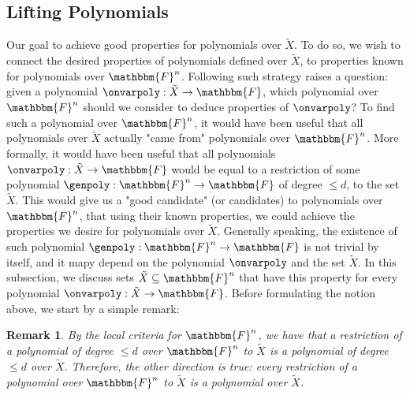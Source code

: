 \documentclass[10pt,a4paper]{article}
\newtheorem{example}[theorem]{Example}
\newtheorem{remark}[theorem]{Remark}
\newcommand{\definedas}[0]{\coloneqq}
\newcommand{\parens}[1]{\left( #1 \right)}
\newcommand{\set}[1]{\left\{ #1 \right\}}
\newcommand{\suchthat}[0]{\middle|}
\newcommand{\basefield}[0]{\mathbbm{F}}
\newcommand{\blocklength}[0]{n}
\newcommand{\field}[0]{\basefield^{\blocklength}}
\newcommand{\degree}[0]{d}
\newcommand{\funcdef}[3]{#1:#2\rightarrow#3}
\newcommand{\variety}{{\tilde{X}}}
\newcommand{\zerofunc}[1]{Z \parens{#1}}
\begin{document}
\subsection[Lifting Polynomials]{Lifting Polynomials}\label{subsec:lifting-polynomials}
Our goal to achieve good properties for polynomials over $\variety$.
To do so, we wish to connect the desired properties of polynomials defined over $\variety$, to properties known for polynomials over $\field$.
Following such strategy raises a question: given a polynomial $\funcdef{\onvarpoly}{\variety}{\basefield}$, which polynomial over $\field$ should we consider to deduce properties of $\onvarpoly$?
To find such a polynomial over $\field$, it would have been useful that all polynomials over $\variety$ actually "came from" polynomials over $\field$.
More formally, it would have been useful that all polynomials $\funcdef{\onvarpoly}{\variety}{\basefield}$ would be equal to a restriction of some polynomial $\funcdef{\genpoly}{\field}{\basefield}$ of degree $\leq \degree$, to the set $\variety$.
This would give us a "good candidate" (or candidates) to polynomials over $\field$, that using their known properties, we could achieve the properties we desire for polynomials over $\variety$.
\newline
Generally speaking, the existence of such polynomial $\funcdef{\genpoly}{\field}{\basefield}$ is not trivial by itself, and it mapy depend on the polynomial $\onvarpoly$ and the set $\variety$.
In this subsection, we discuss sets $\variety \subseteq \field$ that have this property for every polynomial $\funcdef{\onvarpoly}{\variety}{\basefield}$.
Before formulating the notion above, we start by a simple remark:
\begin{remark}
    By the local criteria for $\field$, we have that a restriction of a polynomial of degree $\leq \degree$ over $\field$ to $\variety$ is a polynomial of degree $\leq \degree $ over $\variety$.
    Therefore, the other direction is true: every restriction of a polynomial over $\field$ to $\variety$ is a polynomial over $\variety$.
\end{remark}
%
\end{document}
